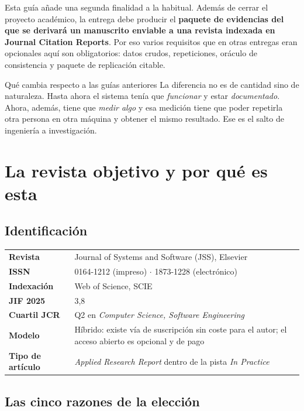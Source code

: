 \documentclass[11pt,a4paper]{article}
\begin{document}
Esta guía añade una segunda finalidad a la habitual. Además de cerrar el proyecto académico, la entrega debe producir el \textbf{paquete de evidencias del que se derivará un manuscrito enviable a una revista indexada en Journal Citation Reports}. Por eso varios requisitos que en otras entregas eran opcionales aquí son obligatorios: datos crudos, repeticiones, oráculo de consistencia y paquete de replicación citable.

\begin{aviso}{Qué cambia respecto a las guías anteriores}
	La diferencia no es de cantidad sino de naturaleza. Hasta ahora el sistema tenía que \emph{funcionar} y estar \emph{documentado}. Ahora, además, tiene que \emph{medir algo} y esa medición tiene que poder repetirla otra persona en otra máquina y obtener el mismo resultado. Ese es el salto de ingeniería a investigación.
\end{aviso}

\section{La revista objetivo y por qué es esta}

\subsection{Identificación}

\begin{center}
	\small
	\begin{tabular}{@{}p{4.4cm}p{10.6cm}@{}}
		\toprule
		\textbf{Revista} & Journal of Systems and Software (JSS), Elsevier \\
		\textbf{ISSN} & 0164-1212 (impreso) $\cdot$ 1873-1228 (electrónico) \\
		\textbf{Indexación} & Web of Science, SCIE \\
		\textbf{JIF 2025} & 3,8 \\
		\textbf{Cuartil JCR} & Q2 en \emph{Computer Science, Software Engineering} \\
		\textbf{Modelo} & Híbrido: existe vía de suscripción sin coste para el autor; el acceso abierto es opcional y de pago \\
		\textbf{Tipo de artículo} & \emph{Applied Research Report} dentro de la pista \emph{In Practice} \\
		\bottomrule
	\end{tabular}
\end{center}

\subsection{Las cinco razones de la elección}
\end{document}

